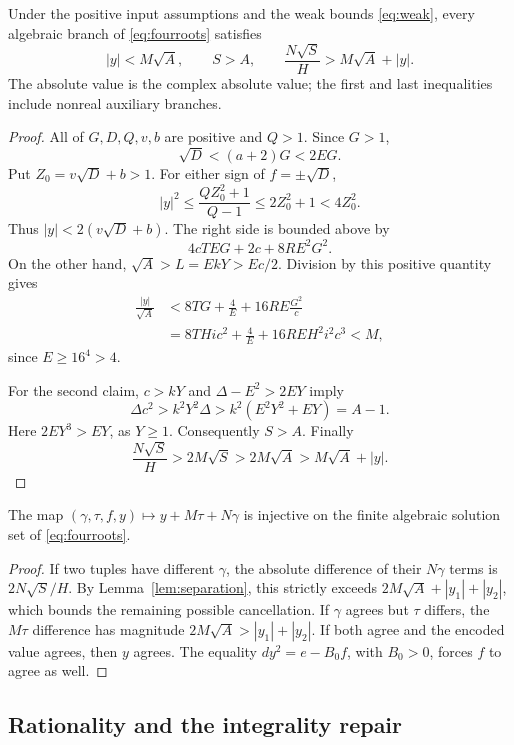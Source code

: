 \begin{lemma}\label{lem:separation}
Under the positive input assumptions and the weak bounds
\eqref{eq:weak}, every algebraic branch of \eqref{eq:fourroots} satisfies
\[
 |y|<M\sqrt A,\qquad S>A,\qquad
 \frac{N\sqrt S}{H}>M\sqrt A+|y|.
\]
The absolute value is the complex absolute value; the first and last
inequalities include nonreal auxiliary branches.
\end{lemma}
\begin{proof}
All of $G,D,Q,v,b$ are positive and $Q>1$. Since $G>1$,
\[
 \sqrt D<(a+2)G<2EG.
\]
Put $Z_0=v\sqrt D+b>1$. For either sign of $f=\pm\sqrt D$,
\[
 |y|^2
 \le\frac{QZ_0^2+1}{Q-1}
 \le2Z_0^2+1<4Z_0^2.
\]
Thus $|y|<2(v\sqrt D+b)$. The right side is bounded above by
\[
 4cTEG+2c+8RE^2G^2.
\]
On the other hand, $\sqrt A>L=EkY>Ec/2$. Division by this positive
quantity gives
\begin{align*}
 \frac{|y|}{\sqrt A}
 &<8TG+\frac4E+16RE\frac{G^2}{c}\\
 &=8THic^2+\frac4E+16REH^2i^2c^3<M,
\end{align*}
since $E\ge16^4>4$.

For the second claim, $c>kY$ and $\Delta-E^2>2EY$ imply
\[
 \Delta c^2>k^2Y^2\Delta
 >k^2(E^2Y^2+EY)=A-1.
\]
Here $2EY^3>EY$, as $Y\ge1$. Consequently $S>A$. Finally
\[
 \frac{N\sqrt S}{H}>2M\sqrt S>2M\sqrt A>M\sqrt A+|y|.
\]
\end{proof}

\begin{lemma}\label{lem:injective}
The map $(\gamma,\tau,f,y)\mapsto y+M\tau+N\gamma$ is injective
on the finite algebraic solution set of \eqref{eq:fourroots}.
\end{lemma}
\begin{proof}
If two tuples have different $\gamma$, the absolute difference of their
$N\gamma$ terms is $2N\sqrt S/H$. By Lemma~\ref{lem:separation}, this
strictly exceeds $2M\sqrt A+|y_1|+|y_2|$, which bounds the remaining
possible cancellation. If $\gamma$ agrees but $\tau$ differs, the
$M\tau$ difference has magnitude $2M\sqrt A>|y_1|+|y_2|$.
If both agree and the encoded value agrees, then $y$ agrees. The equality
$dy^2=e-B_0f$, with $B_0>0$, forces $f$ to agree as well.
\end{proof}

\subsection{Rationality and the integrality repair}

